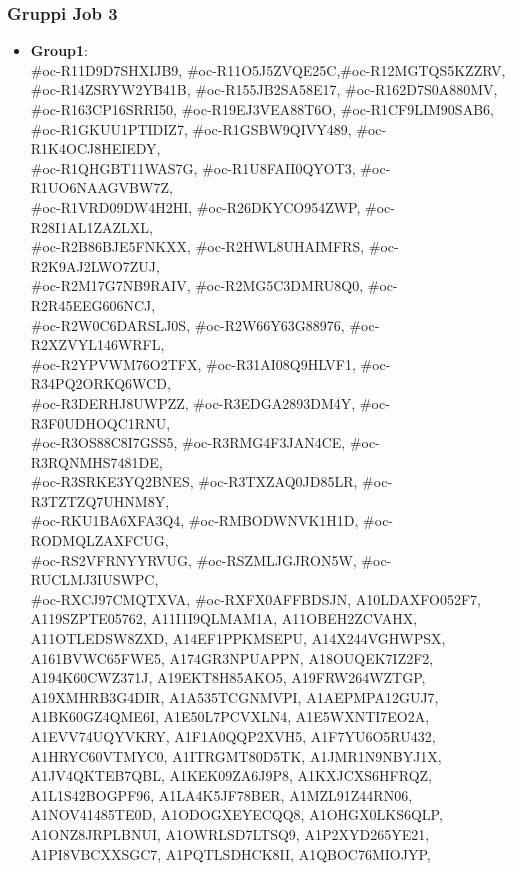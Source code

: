 \subsubsection{Gruppi Job 3}
\begin{itemize}
\item \textbf{\hypertarget{Group1}{Group1}}: \\
    \#oc-R11D9D7SHXIJB9, \#oc-R11O5J5ZVQE25C,\#oc-R12MGTQS5KZZRV, \\ \#oc-R14ZSRYW2YB41B, \#oc-R155JB2SA58E17, \#oc-R162D7S0A880MV, \\ \#oc-R163CP16SRRI50, \#oc-R19EJ3VEA88T6O, \#oc-R1CF9LIM90SAB6, \\ \#oc-R1GKUU1PTIDIZ7, \#oc-R1GSBW9QIVY489, \#oc-R1K4OCJ8HEIEDY, \\ \#oc-R1QHGBT11WAS7G, \#oc-R1U8FAII0QYOT3, \#oc-R1UO6NAAGVBW7Z, \\ \#oc-R1VRD09DW4H2HI, \#oc-R26DKYCO954ZWP, \#oc-R28I1AL1ZAZLXL, \\ \#oc-R2B86BJE5FNKXX, \#oc-R2HWL8UHAIMFRS, \#oc-R2K9AJ2LWO7ZUJ, \\ \#oc-R2M17G7NB9RAIV, \#oc-R2MG5C3DMRU8Q0, \#oc-R2R45EEG606NCJ, \\ \#oc-R2W0C6DARSLJ0S, \#oc-R2W66Y63G88976, \#oc-R2XZVYL146WRFL, \\ \#oc-R2YPVWM76O2TFX, \#oc-R31AI08Q9HLVF1, \#oc-R34PQ2ORKQ6WCD, \\ \#oc-R3DERHJ8UWPZZ, \#oc-R3EDGA2893DM4Y, \#oc-R3F0UDHOQC1RNU, \\ \#oc-R3OS88C8I7GSS5, \#oc-R3RMG4F3JAN4CE, \#oc-R3RQNMHS7481DE, \\ \#oc-R3SRKE3YQ2BNES, \#oc-R3TXZAQ0JD85LR, \#oc-R3TZTZQ7UHNM8Y, \\ \#oc-RKU1BA6XFA3Q4, \#oc-RMBODWNVK1H1D, \#oc-RODMQLZAXFCUG, \\ \#oc-RS2VFRNYYRVUG, \#oc-RSZMLJGJRON5W, \#oc-RUCLMJ3IUSWPC, \\ \#oc-RXCJ97CMQTXVA, \#oc-RXFX0AFFBDSJN, A10LDAXFO052F7, \\ A119SZPTE05762, A11I1I9QLMAM1A, A11OBEH2ZCVAHX, \\ A11OTLEDSW8ZXD, A14EF1PPKMSEPU, A14X244VGHWPSX, \\ A161BVWC65FWE5, A174GR3NPUAPPN, A18OUQEK7IZ2F2, \\ A194K60CWZ371J, A19EKT8H85AKO5, A19FRW264WZTGP, \\ A19XMHRB3G4DIR, A1A535TCGNMVPI, A1AEPMPA12GUJ7, \\ A1BK60GZ4QME6I, A1E50L7PCVXLN4, A1E5WXNTI7EO2A, \\ A1EVV74UQYVKRY, A1F1A0QQP2XVH5, A1F7YU6O5RU432, \\ A1HRYC60VTMYC0, A1ITRGMT80D5TK, A1JMR1N9NBYJ1X, \\ A1JV4QKTEB7QBL, A1KEK09ZA6J9P8, A1KXJCXS6HFRQZ, \\ A1L1S42BOGPF96, A1LA4K5JF78BER, A1MZL91Z44RN06,\\ A1NOV41485TE0D, A1ODOGXEYECQQ8,  A1OHGX0LKS6QLP,\\ A1ONZ8JRPLBNUI, A1OWRLSD7LTSQ9, A1P2XYD265YE21,\\ A1PI8VBCXXSGC7, A1PQTLSDHCK8II, A1QBOC76MIOJYP,\\ 
\end{itemize}
